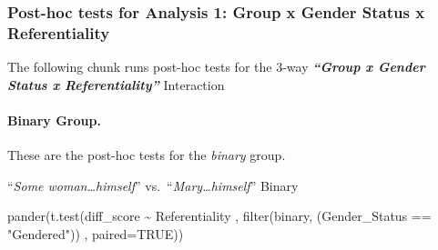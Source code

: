 \documentclass[
]{article}
\newenvironment{Shaded}{\begin{snugshade}}{\end{snugshade}}
\newcommand{\AttributeTok}[1]{\textcolor[rgb]{0.77,0.63,0.00}{#1}}
\newcommand{\ConstantTok}[1]{\textcolor[rgb]{0.00,0.00,0.00}{#1}}
\newcommand{\FunctionTok}[1]{\textcolor[rgb]{0.00,0.00,0.00}{#1}}
\newcommand{\NormalTok}[1]{#1}
\newcommand{\SpecialCharTok}[1]{\textcolor[rgb]{0.00,0.00,0.00}{#1}}
\newcommand{\StringTok}[1]{\textcolor[rgb]{0.31,0.60,0.02}{#1}}
\begin{document}
\hypertarget{post-hoc-tests-for-analysis-1-group-x-gender-status-x-referentiality}{%
\subsubsection{Post-hoc tests for Analysis 1: Group x Gender Status x
Referentiality}\label{post-hoc-tests-for-analysis-1-group-x-gender-status-x-referentiality}}

The following chunk runs post-hoc tests for the 3-way
\textbf{\emph{``Group x Gender Status x Referentiality''}} Interaction

\hypertarget{binary-group.}{%
\paragraph{Binary Group.}\label{binary-group.}}

These are the post-hoc tests for the \emph{binary} group.

``\emph{Some woman\ldots himself}'' vs.~``\emph{Mary\ldots himself}''
Binary

\begin{Shaded}
\begin{Highlighting}[]
\FunctionTok{pander}\NormalTok{(}\FunctionTok{t.test}\NormalTok{(diff\_score }\SpecialCharTok{\textasciitilde{}}\NormalTok{ Referentiality}
\NormalTok{       , }\FunctionTok{filter}\NormalTok{(binary, (Gender\_Status }\SpecialCharTok{==} \StringTok{"Gendered"}\NormalTok{))}
\NormalTok{       , }\AttributeTok{paired=}\ConstantTok{TRUE}\NormalTok{))}
\end{Highlighting}
\end{Shaded}
\end{document}

